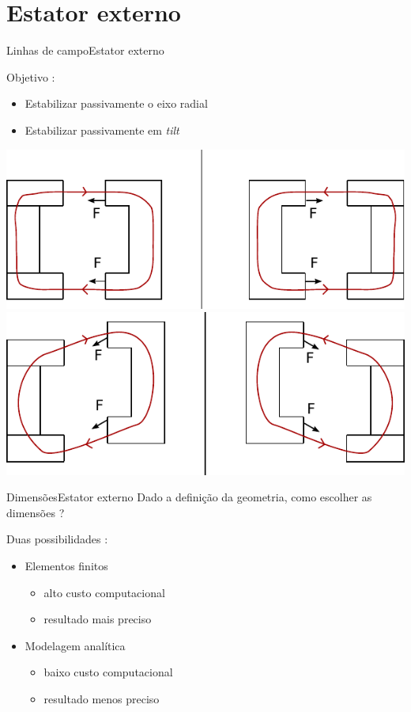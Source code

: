 \documentclass{beamer}
\begin{document}
\section{Estator externo}

\begin{frame}{Linhas de campo}{Estator externo}

Objetivo :
\begin{itemize}
	\item Estabilizar passivamente o eixo radial
	\item Estabilizar passivamente em \textit{tilt}
\end{itemize}
\pause
	\begin{center}
		\includegraphics[width=0.7\linewidth]{../../Dissertacao/Figs/modelo_circuito_passivo_forcas_a} \\
		\pause
		\includegraphics[width=0.7\linewidth]{../../Dissertacao/Figs/modelo_circuito_passivo_forcas_b}
	\end{center}
\end{frame}	



\begin{frame}{Dimensões}{Estator externo}
	Dado a definição da geometria, como escolher as dimensões ?

	\pause
	\vspace{10px}

	Duas possibilidades :
	\begin{itemize}
		\item Elementos finitos
		\begin{itemize}
			\item alto custo computacional 
			\item resultado mais preciso
		\end{itemize}
		\item Modelagem analítica
		\begin{itemize}
			\item baixo custo computacional
			\item resultado menos preciso
		\end{itemize}
	\end{itemize}
	
\end{frame}
\end{document}

